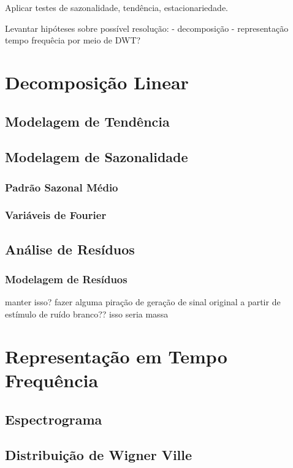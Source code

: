 Aplicar testes de sazonalidade, tendência, estacionariedade.

Levantar hipóteses sobre possível resolução:
    - decomposição
    - representação tempo frequêcia por meio de DWT?

\section{Decomposição Linear}

\subsection{Modelagem de Tendência}

\subsection{Modelagem de Sazonalidade}

\subsubsection{Padrão Sazonal Médio}

\subsubsection{Variáveis de Fourier}

\subsection{Análise de Resíduos}

\subsubsection{Modelagem de Resíduos}

manter isso? fazer alguma piração de geração de sinal original a partir de
estímulo de ruído branco?? isso seria massa

\section{Representação em Tempo Frequência}

\subsection{Espectrograma}

\subsection{Distribuição de Wigner Ville}


